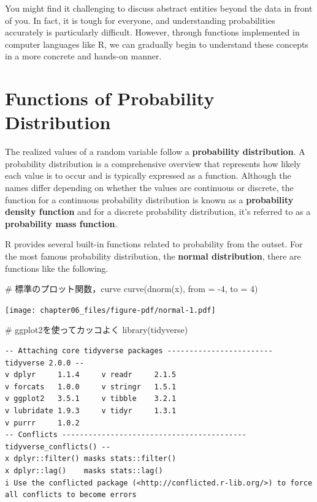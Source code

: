 \documentclass[
  a4paper,
]{book}
\newenvironment{Shaded}{\begin{snugshade}}{\end{snugshade}}
\newcommand{\AttributeTok}[1]{\textcolor[rgb]{0.40,0.45,0.13}{#1}}
\newcommand{\CommentTok}[1]{\textcolor[rgb]{0.37,0.37,0.37}{#1}}
\newcommand{\DecValTok}[1]{\textcolor[rgb]{0.68,0.00,0.00}{#1}}
\newcommand{\FunctionTok}[1]{\textcolor[rgb]{0.28,0.35,0.67}{#1}}
\newcommand{\NormalTok}[1]{\textcolor[rgb]{0.00,0.23,0.31}{#1}}
\newcommand{\SpecialCharTok}[1]{\textcolor[rgb]{0.37,0.37,0.37}{#1}}
\begin{document}
You might find it challenging to discuss abstract entities beyond the
data in front of you. In fact, it is tough for everyone, and
understanding probabilities accurately is particularly difficult.
However, through functions implemented in computer languages like R, we
can gradually begin to understand these concepts in a more concrete and
hands-on manner.

\section{Functions of Probability
Distribution}\label{functions-of-probability-distribution}

The realized values of a random variable follow a \textbf{probability
distribution}. A probability distribution is a comprehensive overview
that represents how likely each value is to occur and is typically
expressed as a function. Although the names differ depending on whether
the values are continuous or discrete, the function for a continuous
probability distribution is known as a \textbf{probability density
function} and for a discrete probability distribution, it's referred to
as a \textbf{probability mass function}.

R provides several built-in functions related to probability from the
outset. For the most famous probability distribution, the \textbf{normal
distribution}, there are functions like the following.

\begin{Shaded}
\begin{Highlighting}[]
\CommentTok{\# 標準のプロット関数，curve}
\FunctionTok{curve}\NormalTok{(}\FunctionTok{dnorm}\NormalTok{(x), }\AttributeTok{from =} \SpecialCharTok{{-}}\DecValTok{4}\NormalTok{, }\AttributeTok{to =} \DecValTok{4}\NormalTok{)}
\end{Highlighting}
\end{Shaded}

\texttt{[image: chapter06\_files/figure-pdf/normal-1.pdf]}

\begin{Shaded}
\begin{Highlighting}[]
\CommentTok{\# ggplot2を使ってカッコよく}
\FunctionTok{library}\NormalTok{(tidyverse)}
\end{Highlighting}
\end{Shaded}

\begin{verbatim}
-- Attaching core tidyverse packages ------------------------ tidyverse 2.0.0 --
v dplyr     1.1.4     v readr     2.1.5
v forcats   1.0.0     v stringr   1.5.1
v ggplot2   3.5.1     v tibble    3.2.1
v lubridate 1.9.3     v tidyr     1.3.1
v purrr     1.0.2     
-- Conflicts ------------------------------------------ tidyverse_conflicts() --
x dplyr::filter() masks stats::filter()
x dplyr::lag()    masks stats::lag()
i Use the conflicted package (<http://conflicted.r-lib.org/>) to force all conflicts to become errors
\end{verbatim}
\end{document}

